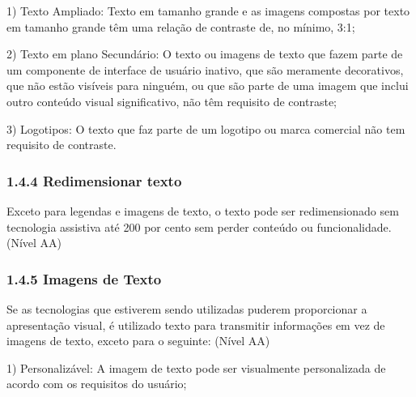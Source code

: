 \documentclass[a4paper]{article}
\begin{document}
\begin{titlepage}
\hspace{.1\textwidth} %
\begin{minipage}{.85\textwidth}
	1) Texto Ampliado: Texto em tamanho grande e as imagens compostas por texto em tamanho grande têm uma relação de contraste de, no mínimo, 3:1;\\
\end{minipage}

\hspace{.1\textwidth} %
\begin{minipage}{.85\textwidth}
	2) Texto em plano Secundário: O texto ou imagens de texto que fazem parte de um componente de interface de usuário inativo, que são meramente decorativos, que não estão visíveis para ninguém, ou que são parte de uma imagem que inclui outro conteúdo visual significativo, não têm requisito de contraste;\\
\end{minipage}

\hspace{.1\textwidth} %
\begin{minipage}{.85\textwidth}
	3) Logotipos: O texto que faz parte de um logotipo ou marca comercial não tem requisito de contraste.\\
\end{minipage}

\subsubsection{1.4.4 Redimensionar texto}

Exceto para legendas e imagens de texto, o texto pode ser redimensionado sem tecnologia assistiva até 200 por cento sem perder conteúdo ou funcionalidade. (Nível AA)

\subsubsection{1.4.5 Imagens de Texto}

Se as tecnologias que estiverem sendo utilizadas puderem proporcionar a apresentação visual, é utilizado texto para transmitir informações em vez de imagens de texto, exceto para o seguinte: (Nível AA)\\

\hspace{.1\textwidth} %
\begin{minipage}{.85\textwidth}
		1) Personalizável: A imagem de texto pode ser visualmente personalizada de acordo com os requisitos do usuário;\\
\end{minipage}


\end{titlepage}
\end{document}
